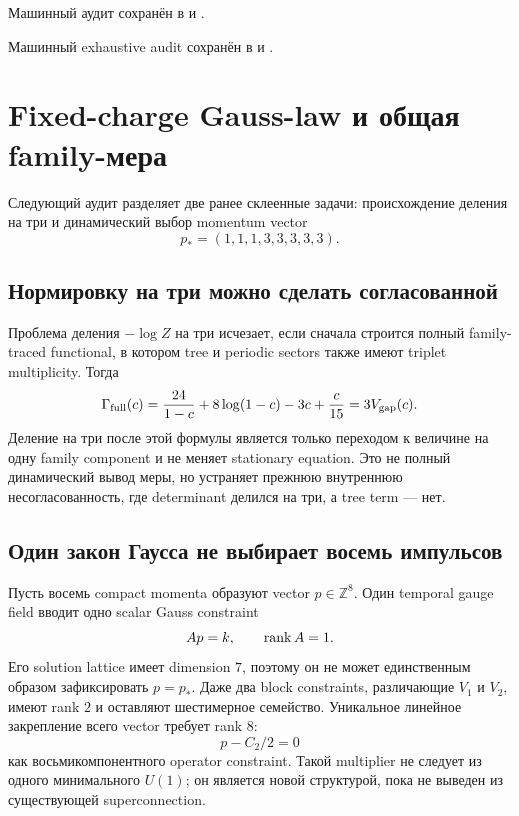 Машинный аудит сохранён в
 и
.

Машинный exhaustive audit сохранён в
 и
.

\section{Fixed-charge Gauss-law и общая family-мера}

Следующий аудит разделяет две ранее склеенные задачи: происхождение деления
на три и динамический выбор momentum vector
\begin{equation}
 p_*=(1,1,1,3,3,3,3,3).
\end{equation}

\subsection{Нормировку на три можно сделать согласованной}

Проблема деления \(-\log Z\) на три исчезает, если сначала строится полный
family-traced functional, в котором tree и periodic sectors также имеют
triplet multiplicity. Тогда
\begin{equation}
 \Gamma_{\rm full}(c)
 =\frac{24}{1-c}+8\log(1-c)-3c+\frac{c}{15}
 =3V_{\rm gap}(c).
\end{equation}
Деление на три после этой формулы является только переходом к величине на
одну family component и не меняет stationary equation. Это не полный
динамический вывод меры, но устраняет прежнюю внутреннюю несогласованность,
где determinant делился на три, а tree term --- нет.

\subsection{Один закон Гаусса не выбирает восемь импульсов}

Пусть восемь compact momenta образуют vector \(p\in\mathbb Z^8\). Один
temporal gauge field вводит одно scalar Gauss constraint
\begin{equation}
 A p=k,
 \qquad \operatorname{rank} A=1.
\end{equation}
Его solution lattice имеет dimension $7$, поэтому он не может единственным
образом зафиксировать $p=p_*$. Даже два block constraints, различающие
$V_1$ и $V_2$, имеют rank $2$ и оставляют шестимерное семейство.
Уникальное линейное закрепление всего vector требует rank $8$:
\begin{equation}
 p-C_2/2=0
\end{equation}
как восьмикомпонентного operator constraint. Такой multiplier не следует из
одного минимального $U(1)$; он является новой структурой, пока не выведен
из существующей superconnection.

